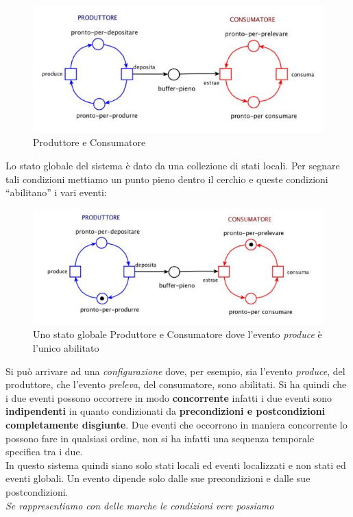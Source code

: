\documentclass[a4paper,12pt, oneside]{book}
\begin{document}
\begin{esempio}
\begin{figure}[H]
    \centering
    \includegraphics[scale = 0.7]{img/prod.jpg}
    \caption{Produttore e Consumatore}
  \end{figure}
  Lo stato globale del sistema è dato da una
  collezione di stati locali. Per segnare tali condizioni mettiamo un punto
  pieno dentro il cerchio e queste condizioni ``abilitano'' i vari eventi:
  \begin{figure}[h]
    \centering
    \includegraphics[scale = 0.7]{img/prod1.jpg}
    \caption{Uno stato globale Produttore e Consumatore dove l’evento\textit{
        produce} è l’unico abilitato} 
  \end{figure}
  Si può arrivare ad una \textit{configurazione} dove, per esempio, sia l'evento
  \textit{produce}, del produttore, che l'evento \textit{preleva}, del
  consumatore, sono abilitati. Si ha quindi che i due eventi possono occorrere
  in modo \textbf{concorrente} infatti i due eventi sono \textbf{indipendenti}
  in quanto condizionati da \textbf{precondizioni e postcondizioni completamente
    disgiunte}. Due eventi che occorrono in maniera concorrente lo possono fare in
  qualsiasi ordine, non si ha infatti una sequenza temporale specifica tra i
  due. \\
  In questo sistema quindi siano solo stati locali ed eventi localizzati e non
  stati ed eventi globali. Un evento dipende solo dalle sue precondizioni e
  dalle sue postcondizioni.\\
  \textit{Se rappresentiamo con delle marche le condizioni vere possiamo
}
\end{esempio}
\end{document}
